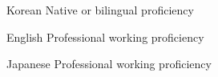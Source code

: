 

\begin{cvskills}

  \cvskill
    {Korean} %
    {Native or bilingual proficiency} %

  \cvskill
    {English} %
    {Professional working proficiency} %

  \cvskill
    {Japanese} %
    {Professional working proficiency} %

\end{cvskills}
